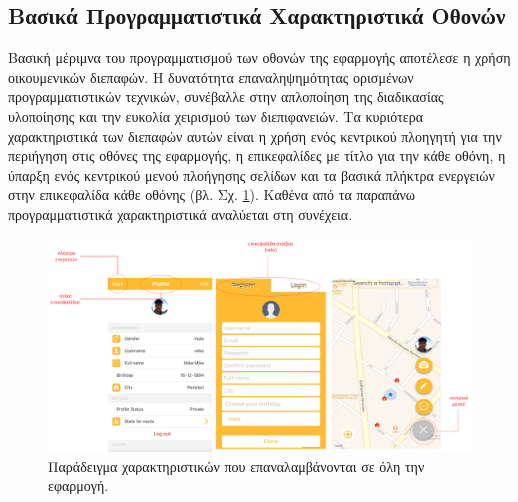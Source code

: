 \subsection{Βασικά Προγραμματιστικά Χαρακτηριστικά Οθονών}
Βασική μέριμνα του προγραμματισμού των οθονών της εφαρμογής αποτέλεσε η χρήση οικουμενικών διεπαφών. Η δυνατότητα επαναληψημότητας ορισμένων προγραμματιστικών τεχνικών, συνέβαλλε στην απλοποίηση της διαδικασίας υλοποίησης και την ευκολία χειρισμού των διεπιφανειών. Τα κυριότερα χαρακτηριστικά των διεπαφών αυτών είναι η χρήση ενός κεντρικού πλοηγητή για την περιήγηση στις οθόνες της εφαρμογής, η επικεφαλίδες με τίτλο για την κάθε οθόνη, η ύπαρξη ενός κεντρικού μενού πλοήγησης σελίδων και τα βασικά πλήκτρα ενεργειών στην επικεφαλίδα κάθε οθόνης (βλ. Σχ. \ref{example}). Καθένα από τα παραπάνω προγραμματιστικά χαρακτηριστικά αναλύεται στη συνέχεια.

\begin{figure}[H]
    \centering
    \includegraphics[scale=0.2]{figures/exaple.png}
    \caption{Παράδειγμα χαρακτηριστικών που επαναλαμβάνονται σε όλη την εφαρμογή.}
    \label{example}
\end{figure}


